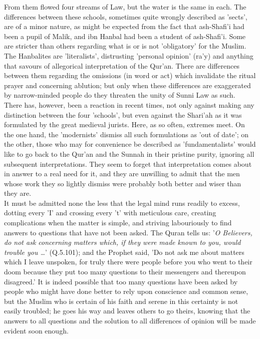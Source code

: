 \documentclass[10pt, twoside]{book}
\begin{document}
From them flowed four streams of Law, but the water is the same in each. The differences between 
these schools, sometimes quite wrongly described as 'sects', are of a minor nature, as might be 
expected from the fact that ash\hyp{}Shafi'i had been a pupil of Malik, and ibn Hanbal had been a student 
of ash\hyp{}Shafi'i. Some are stricter than others regarding what is or is not 'obligatory' for the 
Muslim. The Hanbalites are 'literalists', distrusting 'personal opinion' (ra'y) and anything that 
savours of allegorical interpretation of the Qur'an. There are differences between them regarding the 
omissions (in word or act) which invalidate the ritual prayer and concerning ablution; but only when 
these differences are exaggerated by narrow\hyp{}minded people do they threaten the unity of Sunni Law as 
such. \\

There has, however, been a reaction in recent times, not only against making any distinction between 
the four 'schools', but even against the Shari'ah as it was formulated by the great medieval jurists. 
Here, as so often, extremes meet. On the one hand, the 'modernists' dismiss all such formulations as 
'out of date'; on the other, those who may for convenience be described as 'fundamentalists' would 
like to go back to the Qur'an and the Sunnah in their pristine purity, ignoring all subsequent 
interpretations. They seem to forget that interpretation comes about in answer to a real need for it, 
and they are unwilling to admit that the men whose work they so lightly dismiss were probably both 
better and wiser than they are. \\

It must be admitted none the less that the legal mind runs readily to excess, dotting every 'I' and 
crossing every 't' with meticulous care, creating complications when the matter is simple, and 
striving labouriously to find answers to questions that have not been asked. The Quran tells us: '\emph{O Believers, do not ask concerning matters which, if they were made known to you, would trouble you 
\ldots{}}' (Q.5.101); and the Prophet said, 'Do not ask me about matters which I leave unspoken, for truly 
there were people before you who went to their doom because they put too many questions to their 
messengers and thereupon disagreed.' It is indeed possible that too many questions have been asked by 
people who might have done better to rely upon conscience and common sense, but the Muslim who is 
certain of his faith and serene in this certainty is not easily troubled; he goes his way and leaves 
others to go theirs, knowing that the answers to all questions and the solution to all differences of 
opinion will be made evident soon enough. \\
\end{document}
